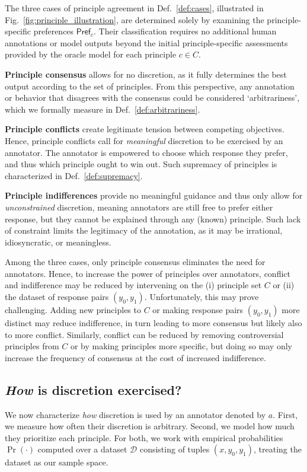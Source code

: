 \documentclass{article}
\newcommand{\pref}{\textsf{Pref}}
\begin{document}
The three cases of principle agreement in Def.~\ref{def:cases}, illustrated in Fig.~\ref{fig:principle_illustration}, are determined solely by examining the principle-specific preferences $\pref_c$. Their classification requires no additional human annotations or model outputs beyond the initial principle-specific assessments provided by the oracle model for each principle $c \in C$. 





\noindent\textbf{Principle consensus} allows for no discretion, as it fully determines the best output according to the set of principles. From this perspective, any annotation or behavior that disagrees with the consensus could be considered `arbitrariness', which we formally measure in Def.~\ref{def:arbitrariness}.

\noindent\textbf{Principle conflicts} create legitimate tension between competing objectives. Hence, principle conflicts call for \textit{meaningful} discretion to be exercised by an annotator. The annotator is empowered to choose which response they prefer, and thus which principle ought to win out. Such supremacy of principles is characterized in Def.~\ref{def:supremacy}.

\noindent\textbf{Principle indifferences} provide no meaningful guidance and thus only allow for \textit{unconstrained} discretion, meaning annotators are still free to prefer either response, but they cannot be explained through any (known) principle. Such lack of constraint limits the legitimacy of the annotation, as it may be irrational, idiosyncratic, or meaningless.

Among the three cases, only principle consensus eliminates the need for annotators. Hence, to increase the power of principles over annotators, conflict and indifference may be reduced by intervening on the (i) principle set $C$ or (ii) the dataset of response pairs $(y_0, y_1)$. Unfortunately, this may prove challenging. 
Adding new principles to $C$ or making response pairs $(y_0, y_1)$ more distinct may reduce indifference, in turn leading to more consensus but likely also to more conflict.
Similarly, conflict can be reduced by removing controversial principles from $C$ or by making principles more specific, but doing so may only increase the frequency of consensus at the cost of increased indifference.


\subsection{\textit{How} is discretion exercised?}\label{sec:discretion_exercised}
We now characterize \textit{how} discretion is used by an annotator denoted by $a$. 
First, we measure how often their discretion is arbitrary. Second, we model how much they prioritize each principle. 
For both, we work with empirical probabilities $\Pr(\cdot)$ computed over a dataset $\mathcal{D}$ consisting of tuples $(x, y_0, y_1)$, treating the dataset as our sample space. 
\end{document}
